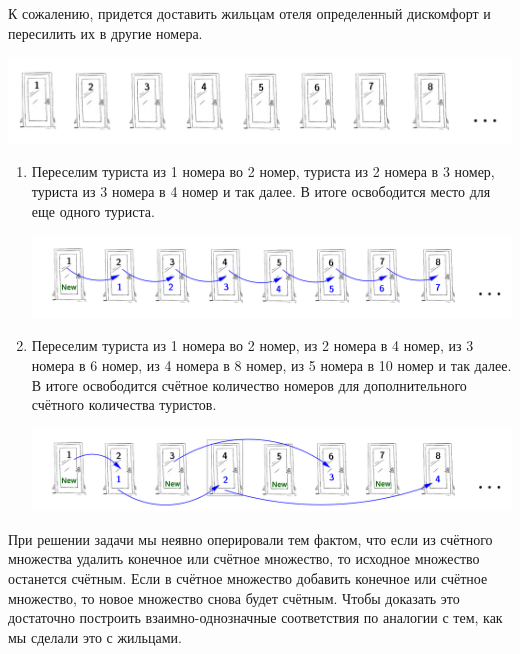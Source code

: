\begin{solution}{1.1}
К сожалению, придется доставить жильцам отеля определенный дискомфорт и пересилить их в другие номера.

\begin{center}
\includegraphics[scale=1.2]{door1}
\end{center}

\begin{enumerate}
\item Переселим туриста из 1 номера во 2 номер, туриста из 2 номера в 3 номер, туриста из 3 номера в 4 номер и так далее. В итоге освободится место для еще одного туриста.

\begin{center}
\includegraphics[scale=1.2]{door2}
\end{center}

\item Переселим туриста из 1 номера во 2 номер, из 2 номера в 4 номер, из 3 номера в 6 номер, из 4 номера в 8 номер, из 5 номера в 10 номер и так далее. В итоге освободится счётное количество номеров для дополнительного счётного количества туристов.

\begin{center}
\includegraphics[scale=1.2]{door3}
\end{center}

\end{enumerate}

При решении задачи мы неявно оперировали тем фактом, что если из счётного множества удалить конечное или счётное множество, то исходное множество останется счётным. Если в счётное множество добавить конечное или счётное множество, то новое множество снова будет счётным. Чтобы доказать это достаточно построить взаимно-однозначные соответствия по аналогии с тем, как мы сделали это с жильцами.

\end{solution}
